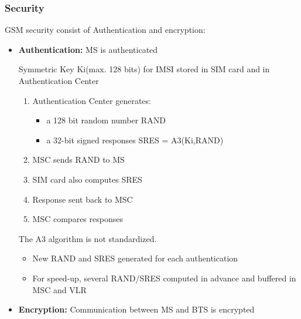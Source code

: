 \subsubsection{Security}
GSM security consist of Authentication and encryption:

\begin{itemize}
	\item \textbf{Authentication:} MS is authenticated

        Symmetric Key Ki(max. 128 bits) for IMSI stored in SIM
        card and in Authentication Center
        \begin{enumerate}
            \item Authentication Center generates:
                \begin{itemize}
                    \item a 128 bit random number RAND
                    \item a 32-bit signed responses SRES = A3(Ki,RAND)
                \end{itemize}
            \item MSC sends RAND to MS
            \item SIM card also computes SRES
            \item Response sent back to MSC
            \item MSC compares responses
        \end{enumerate}
        The A3 algorithm is not standardized. 
        \begin{itemize}
            \item New RAND and SRES generated for each authentication
            \item For speed-up, several RAND/SRES computed  in advance and
                buffered in MSC and VLR
        \end{itemize}

    \item \textbf{Encryption:} Communication between MS and BTS is encrypted


\end{itemize}
